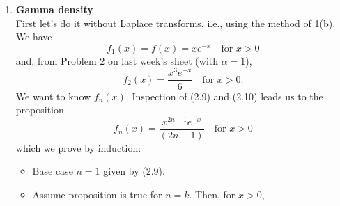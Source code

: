 \documentclass[11pt,a4paper]{article}
\begin{document}
\begin{enumerate}
    \item \textbf{Gamma density}\\
    First let's do it without Laplace transforms, i.e., using the method of 1(b). We have
    \begin{equation}\tag{2.9}
      f_1(x) = f(x) = xe^{-x}\quad \text{for $x > 0$}
    \end{equation}
    and, from Problem 2 on last week's sheet (with $\alpha = 1$),
    \begin{equation}\tag{2.10}
      f_2(x) = \frac{x^3e^{-x}}{6}\quad \text{for $x > 0$}.
    \end{equation}
    We want to know $f_n(x)$. Inspection of (2.9) and (2.10) leads us to the proposition
    \begin{equation}\tag{2.11}
      f_n(x) = \frac{x^{2n - 1}e^{-x}}{(2n - 1)}\quad \text{for $x > 0$}
    \end{equation}
    which we prove by induction:
    \begin{itemize}
      \item Base case $n = 1$ given by (2.9).
      \item Assume proposition is true for $n = k$. Then, for $x > 0$,
    \end{itemize}

  \end{enumerate}
\end{document}
